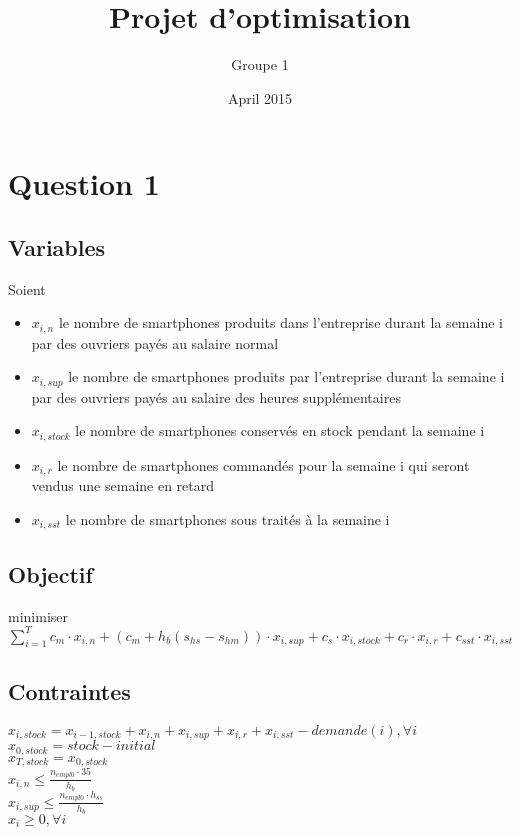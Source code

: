 \documentclass{article}
\title{Projet d'optimisation}
\author{Groupe 1}
\date{April 2015}
\begin{document}
\maketitle

\section{Question 1}

\subsection*{Variables}
Soient 
\begin{itemize}
\item $x_{i,n}$ le nombre de smartphones produits dans l'entreprise durant la semaine i par des ouvriers payés au salaire normal
\item $x_{i,sup}$ le nombre de smartphones produits par l'entreprise durant la semaine i par des ouvriers payés au salaire des heures supplémentaires

\item $x_{i,stock}$ le nombre de smartphones conservés en stock pendant la semaine i
\item $x_{i,r}$ le nombre de smartphones commandés pour la semaine i qui seront vendus une semaine en retard
\item $x_{i,sst}$ le nombre de smartphones sous traités à la semaine i
\end{itemize}

\subsection*{Objectif}

minimiser $\sum_{i=1}^{T} c_m \cdot x_{i,n} + (c_m + h_b (s_{hs} - s_{hm})) \cdot x_{i,sup} + c_s \cdot x_{i,stock} + c_r \cdot x_{i,r} + c_{sst} \cdot x_{i,sst} $

\subsection*{Contraintes}

$x_{i,stock} = x_{i-1,stock} + x_{i,n} + x_{i,sup} + x_{i,r} + x_{i,sst} - demande(i), \forall i$ \\
$x_{0, stock} = stock-initial$ \\
$x_{T, stock} = x_{0, stock}$ \\
$x_{i,n} \leq \frac{n_{empl0} \cdot 35}{h_b}$ \\
$x_{i,sup} \leq \frac{n_{empl0} \cdot h_{ss}}{h_{b}}$ \\
$x_i \geq 0, \forall i$ \\
\end{document}
